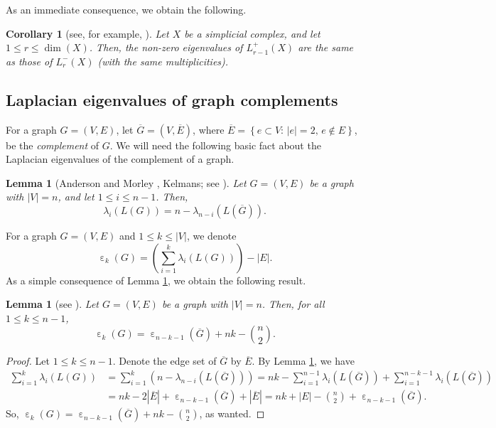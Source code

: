 \documentclass[a4paper,11pt]{article}
\theoremstyle{plain}
\newtheorem{corollary}[theorem]{\bf Corollary}
\newtheorem{lemma}[theorem]{\bf Lemma}
\theoremstyle{definition}
\numberwithin{theorem}{section}
\numberwithin{equation}{section}
\DeclareMathOperator{\eps}{\varepsilon}
\begin{document}
As an immediate consequence, we obtain the following.

\begin{corollary}[see, for example, \cite{duval2002shifted}]\label{cor:Lminus_L}
    Let $X$ be a simplicial complex, and let $1\le r\le \dim(X)$. Then, the non-zero eigenvalues of $L_{r-1}^{+}(X)$ are the same as those of $L^-_r(X)$ (with the same multiplicities).
\end{corollary}



\subsection{Laplacian eigenvalues of graph complements}


For a graph $G=(V,E)$, let $\overline{G}=(V,\overline{E})$, where $\overline{E}= \left\{e\subset V:\, |e|=2,\,  e\notin E\right\}$,  be the \emph{complement} of $G$. We will need the following basic fact about the Laplacian eigenvalues of the complement of a graph.

\begin{lemma}[Anderson and Morley \cite{anderson1985eigenvalues}, Kelmans; see {\cite[Theorem 3.3]{hammer1996laplacian}}]\label{lemma:complement}
    Let $G=(V,E)$ be a graph with $|V|=n$, and let $1\le i\le n-1$. Then,
    \[
        \lambda_i(L(G))= n- \lambda_{n-i}(L(\overline{G})).
    \]
\end{lemma}

For a graph $G=(V,E)$ and $1\le k\le |V|$, we denote
\[
    \eps_k(G)= \left(\sum_{i=1}^k \lambda_i(L(G))\right)-|E|.
\]
As a simple consequence of Lemma \ref{lemma:complement}, we obtain the following result.

\begin{lemma}[see {\cite[Theorem 3.1]{chen2019onbrouwers}}]
\label{lemma:complement_eps}
    Let $G=(V,E)$ be a graph with $|V|=n$. Then, for all $1\le k\le n-1$,
    \[
        \eps_k(G)= \eps_{n-k-1}(\overline{G}) +nk -\binom{n}{2}.
    \]
\end{lemma}
\begin{proof}
    Let $1\le k\le n-1$. Denote the edge set of $\overline{G}$ by $\overline{E}$. By Lemma \ref{lemma:complement}, we have
    \begin{align*}
        \sum_{i=1}^{k} \lambda_i(L(G)) &= \sum_{i=1}^k  (n-\lambda_{n-i}(L(\overline{G})))
        =nk - \sum_{i=1}^{n-1} \lambda_i (L(\overline{G})) + \sum_{i=1}^{n-k-1} \lambda_i(L(\overline{G}))
        \\
        &= nk - 2|\overline{E}| + \eps_{n-k-1}(\overline{G})+|\overline{E}|= nk+ |E|-\binom{n}{2} + \eps_{n-k-1}(\overline{G}).
    \end{align*}
    So, $\eps_k(G)=\eps_{n-k-1}(\overline{G}) +nk -\binom{n}{2}$, as wanted.
\end{proof}
\end{document}
